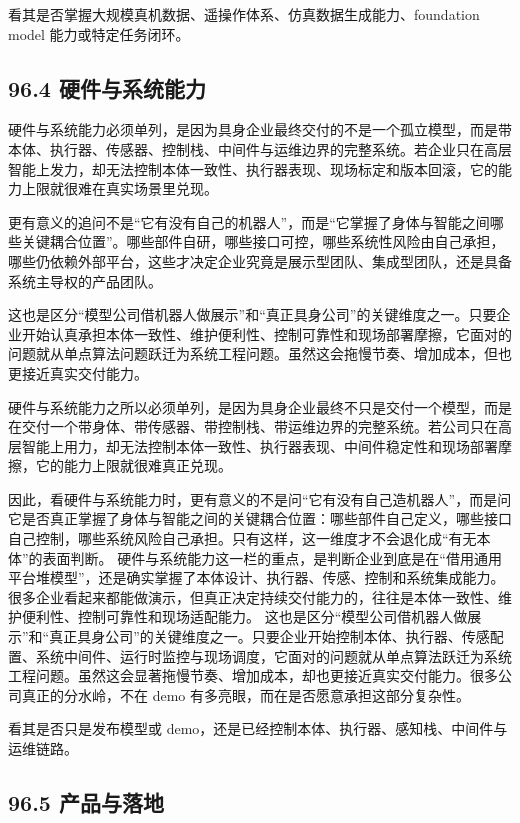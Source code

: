 看其是否掌握大规模真机数据、遥操作体系、仿真数据生成能力、foundation model 能力或特定任务闭环。

\subsection*{96.4 硬件与系统能力}


硬件与系统能力必须单列，是因为具身企业最终交付的不是一个孤立模型，而是带本体、执行器、传感器、控制栈、中间件与运维边界的完整系统。若企业只在高层智能上发力，却无法控制本体一致性、执行器表现、现场标定和版本回滚，它的能力上限就很难在真实场景里兑现。

更有意义的追问不是“它有没有自己的机器人”，而是“它掌握了身体与智能之间哪些关键耦合位置”。哪些部件自研，哪些接口可控，哪些系统性风险由自己承担，哪些仍依赖外部平台，这些才决定企业究竟是展示型团队、集成型团队，还是具备系统主导权的产品团队。

这也是区分“模型公司借机器人做展示”和“真正具身公司”的关键维度之一。只要企业开始认真承担本体一致性、维护便利性、控制可靠性和现场部署摩擦，它面对的问题就从单点算法问题跃迁为系统工程问题。虽然这会拖慢节奏、增加成本，但也更接近真实交付能力。

硬件与系统能力之所以必须单列，是因为具身企业最终不只是交付一个模型，而是在交付一个带身体、带传感器、带控制栈、带运维边界的完整系统。若公司只在高层智能上用力，却无法控制本体一致性、执行器表现、中间件稳定性和现场部署摩擦，它的能力上限就很难真正兑现。

因此，看硬件与系统能力时，更有意义的不是问“它有没有自己造机器人”，而是问它是否真正掌握了身体与智能之间的关键耦合位置：哪些部件自己定义，哪些接口自己控制，哪些系统风险自己承担。只有这样，这一维度才不会退化成“有无本体”的表面判断。 硬件与系统能力这一栏的重点，是判断企业到底是在“借用通用平台堆模型”，还是确实掌握了本体设计、执行器、传感、控制和系统集成能力。很多企业看起来都能做演示，但真正决定持续交付能力的，往往是本体一致性、维护便利性、控制可靠性和现场适配能力。 这也是区分“模型公司借机器人做展示”和“真正具身公司”的关键维度之一。只要企业开始控制本体、执行器、传感配置、系统中间件、运行时监控与现场调度，它面对的问题就从单点算法跃迁为系统工程问题。虽然这会显著拖慢节奏、增加成本，却也更接近真实交付能力。很多公司真正的分水岭，不在 demo 有多亮眼，而在是否愿意承担这部分复杂性。

看其是否只是发布模型或 demo，还是已经控制本体、执行器、感知栈、中间件与运维链路。

\subsection*{96.5 产品与落地}


